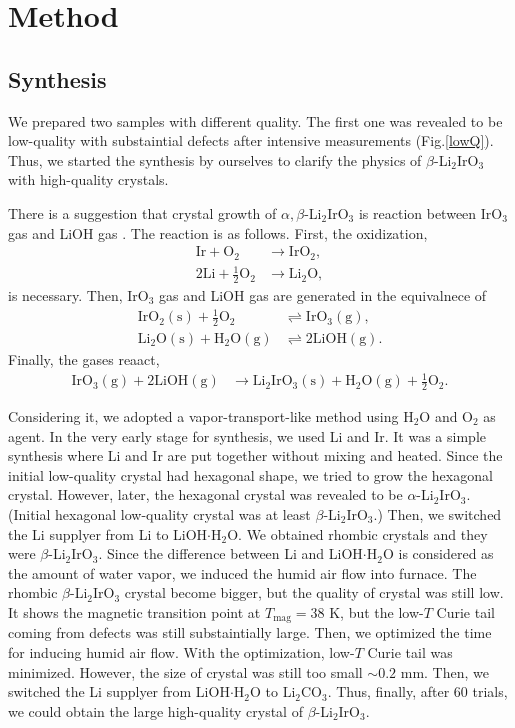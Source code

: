 \chapter{Method}
\label{method}
\section{Synthesis}
We prepared two samples with different quality.
The first one was revealed to be low-quality with substaintial defects after intensive measurements (Fig.\ref{lowQ}).
Thus, we started the synthesis by ourselves to clarify the physics of $\beta$-Li$_2$IrO$_3$ with high-quality crystals.

There is a suggestion that crystal growth of $\alpha, \beta$-Li$_2$IrO$_3$ is reaction between IrO$_3$ gas and LiOH gas \cite{Freund2016}.
The reaction is as follows.
First, the oxidization,
\begin{align}
\mathrm{Ir} + \mathrm{O_2} &\rightarrow \mathrm{IrO_2},\\
\mathrm{2Li} + \mathrm{\frac{1}{2}O_2} &\rightarrow \mathrm{Li_2O},
\end{align}
is necessary.
Then, IrO$_3$ gas and LiOH gas are generated in the equivalnece of
\begin{align}
\mathrm{IrO_2 (s)} + \mathrm{\frac{1}{2}O_2} &\rightleftharpoons \mathrm{IrO_3 (g)},\\
\mathrm{Li_2O (s)} + \mathrm{H_2O (g)} &\rightleftharpoons \mathrm{2LiOH (g)}.
\end{align}
Finally, the gases reaact,
\begin{align}
\mathrm{IrO_3 (g)} + \mathrm{2LiOH (g)} &\rightarrow \mathrm{Li_2IrO_3 (s)} + \mathrm{H_2O (g)} + \mathrm{\frac{1}{2}O_2}.
\end{align}

Considering it, we adopted a vapor-transport-like method using H$_2$O and O$_2$ as agent.
In the very early stage for synthesis, we used Li and Ir.
It was a simple synthesis where Li and Ir are put together without mixing and heated.
Since the initial low-quality crystal had hexagonal shape, we tried to grow the hexagonal crystal.
However, later, the hexagonal crystal was revealed to be $\alpha$-Li$_2$IrO$_3$.
(Initial hexagonal low-quality crystal was at least $\beta$-Li$_2$IrO$_3$.)
Then, we switched the Li supplyer from Li to LiOH$\cdot$H$_2$O.
We obtained rhombic crystals and they were $\beta$-Li$_2$IrO$_3$.
Since the difference between Li and LiOH$\cdot$H$_2$O is considered as the amount of water vapor, we induced the humid air flow into furnace.
The rhombic $\beta$-Li$_2$IrO$_3$ crystal become bigger, but the quality of crystal was still low.
It shows the magnetic transition point at $T_\mathrm{mag} = 38$ K, but the low-$T$ Curie tail coming from defects was still substaintially large.
Then, we optimized the time for inducing humid air flow.
With the optimization, low-$T$ Curie tail was minimized.
However, the size of crystal was still too small $\sim 0.2$ mm.
Then, we switched the Li supplyer from LiOH$\cdot$H$_2$O to Li$_2$CO$_3$.
Thus, finally, after 60 trials, we could obtain the large high-quality crystal of $\beta$-Li$_2$IrO$_3$.

